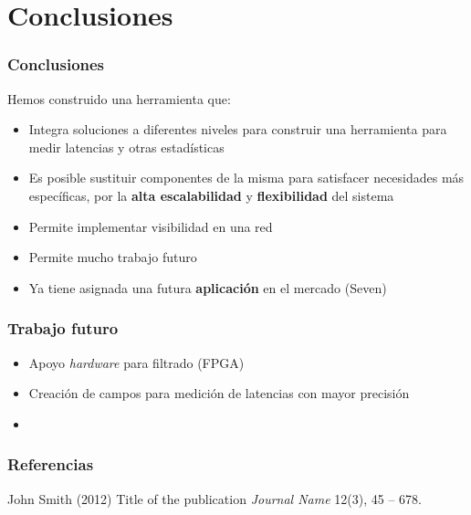 \documentclass{beamer}
\begin{document}
\section{Conclusiones}


\begin{frame}
\frametitle{Conclusiones}
Hemos construido una herramienta que:

\begin{itemize}
	\item Integra soluciones a diferentes niveles para construir una herramienta para medir latencias y otras estadísticas
	\item Es posible sustituir componentes de la misma para satisfacer necesidades más específicas, por la \textbf{alta escalabilidad} y \textbf{flexibilidad} del sistema
	\item Permite implementar visibilidad en una red
	\item Permite mucho trabajo futuro
	\item Ya tiene asignada una futura \textbf{aplicación} en el mercado (Seven)
\end{itemize}

\end{frame}


\begin{frame}
\frametitle{Trabajo futuro}
\begin{itemize}
	\item Apoyo \textit{hardware} para filtrado (FPGA)
	\item Creación de campos para medición de latencias con mayor precisión
	\item 
\end{itemize}

\end{frame}


\begin{frame}
\frametitle{Referencias}
\footnotesize{
\begin{thebibliography}{99} %
 John Smith (2012)
\newblock Title of the publication
\newblock \emph{Journal Name} 12(3), 45 -- 678.
\end{thebibliography}
}
\end{frame}

\end{document}
